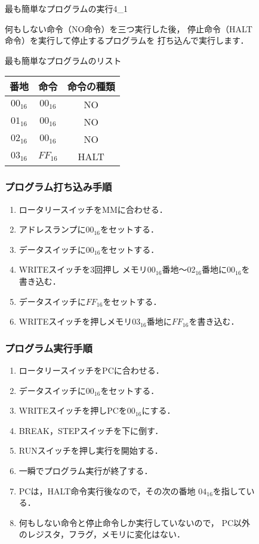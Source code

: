 \begin{figure}[tb]
\begin{rei}{最も簡単なプログラムの実行}{4_1}

何もしない命令（NO命令）を三つ実行した後，
停止命令（HALT命令）を実行して停止するプログラムを
打ち込んで実行します．

{\tt\small\begin{center}
最も簡単なプログラムのリスト
\begin{tabular}{|c|c|c|} \hline
番地 & 命令 & 命令の種類\\
\hline
$00_{16}$ & $00_{16}$ & NO \\
$01_{16}$ & $00_{16}$ & NO \\
$02_{16}$ & $00_{16}$ & NO \\
$03_{16}$ & $FF_{16}$ & HALT \\
\hline
\end{tabular}
\end{center}}

\subsubsection{プログラム打ち込み手順}

\begin{enumerate}
\item ロータリースイッチをMMに合わせる．
\item アドレスランプに$00_{16}$をセットする．
\item データスイッチに$00_{16}$をセットする．
\item WRITEスイッチを3回押し
メモリ$00_{16}$番地〜$02_{16}$番地に$00_{16}$を書き込む．
\item データスイッチに$FF_{16}$をセットする．
\item WRITEスイッチを押しメモリ$03_{16}$番地に$FF_{16}$を書き込む．
\end{enumerate}

\subsubsection{プログラム実行手順}

\begin{enumerate}
\item ロータリースイッチをPCに合わせる．
\item データスイッチに$00_{16}$をセットする．
\item WRITEスイッチを押しPCを$00_{16}$にする．
\item BREAK，STEPスイッチを下に倒す．
\item RUNスイッチを押し実行を開始する．
\item 一瞬でプログラム実行が終了する．
\item PCは，HALT命令実行後なので，その次の番地 $04_{16}$を指している．
\item 何もしない命令と停止命令しか実行していないので，
PC以外のレジスタ，フラグ，メモリに変化はない．
\end{enumerate}

\end{rei}
\end{figure}


